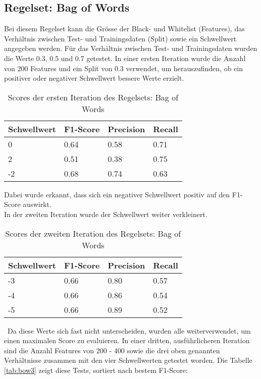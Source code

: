 \subsection{Regelset: Bag of Words}
Bei diesem Regelset kann die Grösse der Black- und Whitelist (Features), das Verhältnis zwischen Test- und Trainingsdaten (Split) sowie ein Schwellwert angegeben werden.
Für das Verhältnis zwischen Test- und Trainingsdaten wurden die Werte 0.3, 0.5 und 0.7 getestet.
In einer ersten Iteration wurde die Anzahl von 200 Features und ein Split von 0.3 verwendet, um herauszufinden, ob ein positiver oder negativer Schwellwert bessere Werte erzielt.\\
\begin{table}[H]
	\caption{Scores der ersten Iteration des Regelsets: Bag of Words}
	\centering
\begin{tabular}{|l|l|l|l|}
	\hline
	Schwellwert & F1-Score & Precision & Recall\\
	\hline
	0 & 0.64 & 0.58 & 0.71 \\
	2 & 0.51 & 0.38 & 0.75 \\
	-2 & 0.68 & 0.74 & 0.63 \\
	\hline
\end{tabular}
\end{table}
Dabei wurde erkannt, dass sich ein negativer Schwellwert positiv auf den F1-Score auswirkt.\\
In der zweiten Iteration wurde der Schwellwert weiter verkleinert.\\
\begin{table}[H]
	\caption{Scores der zweiten Iteration des Regelsets: Bag of Words}
	\centering
\begin{tabular}{|l|l|l|l|}
	\hline
	Schwellwert & F1-Score & Precision & Recall\\
	\hline
	-3 & 0.66 & 0.80 & 0.57 \\
	-4 & 0.66 & 0.86 & 0.54 \\
	-5 & 0.66 & 0.89 & 0.52 \\
	\hline
\end{tabular}
\end{table}\
Da diese Werte sich fast nicht unterscheiden, wurden alle weiterverwendet, um einen maximalen Score zu evaluieren.
In einer dritten, ausführlicheren Iteration sind die Anzahl Features von 200 - 400 sowie die drei oben genannten Verhältnisse zusammen mit den vier Schwellwerten getestet worden. Die Tabelle \cref{tab:bow3} zeigt diese Tests, sortiert nach bestem F1-Score:\\
\FloatBarrier
